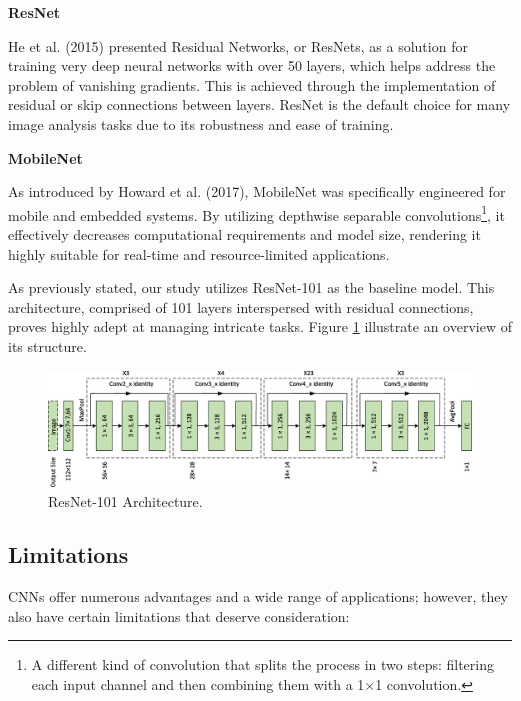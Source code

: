 \documentclass[a4paper,10pt]{book}
\begin{document}
\textbf{ResNet}

He et al. (2015) \cite{he_deep_2015} presented Residual Networks, or ResNets, as a solution for training very deep neural networks with over 50 layers, which helps address the problem of vanishing gradients. This is achieved through the implementation of residual or skip connections between layers. ResNet is the default choice for many image analysis tasks due to its robustness and ease of training.

\textbf{MobileNet}

As introduced by Howard et al. (2017), MobileNet was specifically engineered for mobile and embedded systems. By utilizing depthwise separable convolutions\footnote{A different kind of convolution that splits the process in two steps: filtering each input channel and then combining them with a 1×1 convolution.}, it effectively decreases computational requirements and model size, rendering it highly suitable for real-time and resource-limited applications.

As previously stated, our study utilizes ResNet-101 as the baseline model. This architecture, comprised of 101 layers interspersed with residual connections, proves highly adept at managing intricate tasks. Figure \ref{fig:resnet_101} illustrate an overview of its structure.

\begin{figure}[h!]
    \centering
    \includegraphics[width=0.75\linewidth]{reports//assets/resnet101.jpg}
    \caption[ResNet-101 Architecture]{ResNet-101 Architecture.}
    \label{fig:resnet_101}
\end{figure}


\subsection{Limitations}

CNNs offer numerous advantages and a wide range of applications; however, they also have certain limitations that deserve consideration:
\end{document}
